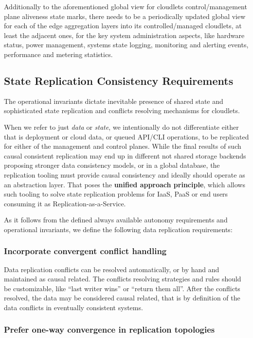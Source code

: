 \documentclass[conference]{IEEEtran}
\begin{document}
Additionally to the aforementioned global view for cloudlets control/management
plane aliveness state marks, there needs to be a periodically updated global
view for each of the edge aggregation layers into its controlled/managed
cloudlets, at least the adjacent ones, for the key system administration
aspects, like hardware status, power management, systems state logging,
monitoring and alerting events, performance and metering statistics.

\subsection{State Replication Consistency Requirements}

The operational invariants dictate inevitable presence of shared state and
sophisticated state replication and conflicts resolving
mechanisms for cloudlets.

When we refer to just \textit{data} or \textit{state}, we intentionally do not
differentiate either that is deployment or cloud data, or queued API/CLI
operations, to be replicated for either of the management and control planes.
While the final results of such causal consistent replication may end up in
different not shared storage backends proposing stronger data consistency
models, or in a global database, the replication tooling must provide causal
consistency and ideally should operate as an abstraction layer. That poses the
\textbf{unified approach principle}, which allows such tooling to solve state
replication problems for IaaS, PaaS or end users consuming it as
Replication-as-a-Service.

As it follows from the defined always available autonomy requirements and
operational invariants, we define the following data replication requirements:

\subsubsection{Incorporate convergent conflict handling\cite{b1}}

Data replication conflicts can be resolved automatically, or by hand and
maintained as causal related. The conflicts resolving strategies and rules
should be customizable, like ``last writer wins'' or ``return them all''. After
the conflicts resolved, the data may be considered causal related, that is by
definition\cite{b1} of the data conflicts in eventually consistent systems.

\subsubsection{Prefer one-way convergence in replication topologies}
\end{document}
